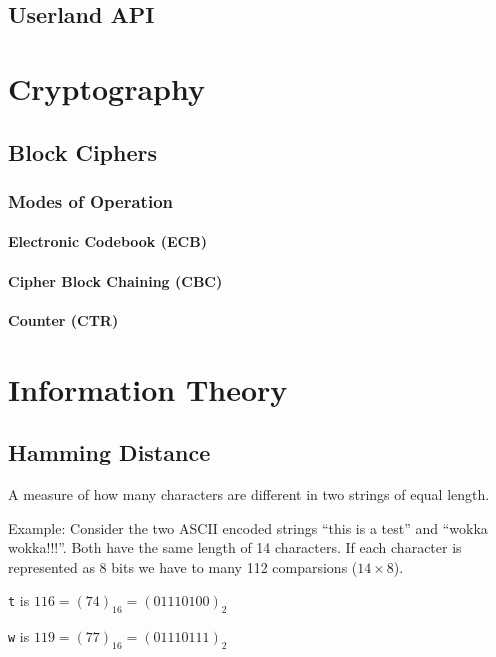 \documentclass[12pt]{book}
\begin{document}
  \section{Userland API}

  \chapter{Cryptography}

  \section{Block Ciphers}

  \subsection{Modes of Operation}

  \subsubsection{Electronic Codebook (ECB)}

  \subsubsection{Cipher Block Chaining (CBC)}

  \subsubsection{Counter (CTR)}

  \chapter{Information Theory}

  \section{Hamming Distance}

  A measure of how many characters are different in two strings of equal length.

  Example: Consider the two ASCII encoded strings ``this is a test'' and ``wokka
  wokka!!!''. Both have the same length of 14 characters. If each character is
  represented as 8 bits we have to many 112 comparsions ($14 \times 8$).

  \texttt{t} is $116 = (74)_{16} = (01110100)_{2}$

  \texttt{w} is $119 = (77)_{16} = (01110111)_{2}$
\end{document}
